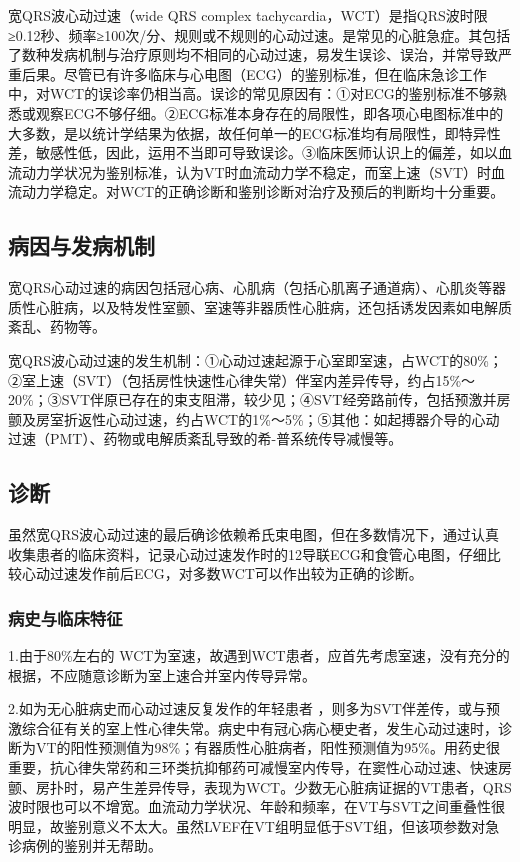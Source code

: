 宽QRS波心动过速（wide QRS complex
tachycardia，WCT）是指QRS波时限≥0.12秒、频率≥100次/分、规则或不规则的心动过速。是常见的心脏急症。其包括了数种发病机制与治疗原则均不相同的心动过速，易发生误诊、误治，并常导致严重后果。尽管已有许多临床与心电图（ECG）的鉴别标准，但在临床急诊工作中，对WCT的误诊率仍相当高。误诊的常见原因有：①对ECG的鉴别标准不够熟悉或观察ECG不够仔细。②ECG标准本身存在的局限性，即各项心电图标准中的大多数，是以统计学结果为依据，故任何单一的ECG标准均有局限性，即特异性差，敏感性低，因此，运用不当即可导致误诊。③临床医师认识上的偏差，如以血流动力学状况为鉴别标准，认为VT时血流动力学不稳定，而室上速（SVT）时血流动力学稳定。对WCT的正确诊断和鉴别诊断对治疗及预后的判断均十分重要。

\subsection{病因与发病机制}

宽QRS心动过速的病因包括冠心病、心肌病（包括心肌离子通道病）、心肌炎等器质性心脏病，以及特发性室颤、室速等非器质性心脏病，还包括诱发因素如电解质紊乱、药物等。

宽QRS波心动过速的发生机制：①心动过速起源于心室即室速，占WCT的80\%；②室上速（SVT）（包括房性快速性心律失常）伴室内差异传导，约占15\%～20\%；③SVT伴原已存在的束支阻滞，较少见；④SVT经旁路前传，包括预激并房颤及房室折返性心动过速，约占WCT的1\%～5\%；⑤其他：如起搏器介导的心动过速（PMT）、药物或电解质紊乱导致的希-普系统传导减慢等。

\subsection{诊断}

虽然宽QRS波心动过速的最后确诊依赖希氏束电图，但在多数情况下，通过认真收集患者的临床资料，记录心动过速发作时的12导联ECG和食管心电图，仔细比较心动过速发作前后ECG，对多数WCT可以作出较为正确的诊断。

\subsubsection{病史与临床特征}

1.由于80\%左右的
WCT为室速，故遇到WCT患者，应首先考虑室速，没有充分的根据，不应随意诊断为室上速合并室内传导异常。

2.如为无心脏病史而心动过速反复发作的年轻患者
，则多为SVT伴差传，或与预激综合征有关的室上性心律失常。病史中有冠心病心梗史者，发生心动过速时，诊断为VT的阳性预测值为98\%；有器质性心脏病者，阳性预测值为95\%。用药史很重要，抗心律失常药和三环类抗抑郁药可减慢室内传导，在窦性心动过速、快速房颤、房扑时，易产生差异传导，表现为WCT。少数无心脏病证据的VT患者，QRS波时限也可以不增宽。血流动力学状况、年龄和频率，在VT与SVT之间重叠性很明显，故鉴别意义不太大。虽然LVEF在VT组明显低于SVT组，但该项参数对急诊病例的鉴别并无帮助。

